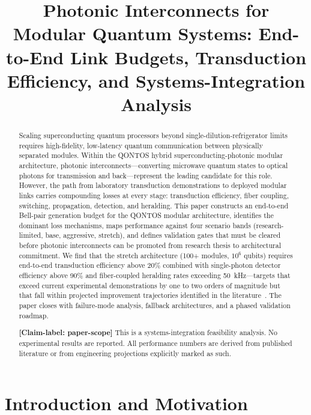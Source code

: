 \documentclass[conference]{IEEEtran}
\begin{document}
\title{Photonic Interconnects for Modular Quantum Systems: End-to-End Link Budgets, Transduction Efficiency, and Systems-Integration Analysis}

\author{\qontosauthor}

\maketitle

\begin{abstract}
Scaling superconducting quantum processors beyond single-dilution-refrigerator limits requires high-fidelity, low-latency quantum communication between physically separated modules. Within the QONTOS hybrid superconducting-photonic modular architecture, photonic interconnects---converting microwave quantum states to optical photons for transmission and back---represent the leading candidate for this role. However, the path from laboratory transduction demonstrations to deployed modular links carries compounding losses at every stage: transduction efficiency, fiber coupling, switching, propagation, detection, and heralding. This paper constructs an end-to-end Bell-pair generation budget for the QONTOS modular architecture, identifies the dominant loss mechanisms, maps performance against four scenario bands (research-limited, base, aggressive, stretch), and defines validation gates that must be cleared before photonic interconnects can be promoted from research thesis to architectural commitment. We find that the stretch architecture (100+ modules, $10^6$ qubits) requires end-to-end transduction efficiency above 20\% combined with single-photon detector efficiency above 90\% and fiber-coupled heralding rates exceeding 50~kHz---targets that exceed current experimental demonstrations by one to two orders of magnitude but that fall within projected improvement trajectories identified in the literature~\cite{Awschalom2021, Lauk2020}. The paper closes with failure-mode analysis, fallback architectures, and a phased validation roadmap.

\textbf{[Claim-label: paper-scope]} This is a systems-integration feasibility analysis. No experimental results are reported. All performance numbers are derived from published literature or from engineering projections explicitly marked as such.
\end{abstract}

\section{Introduction and Motivation}
\end{document}

